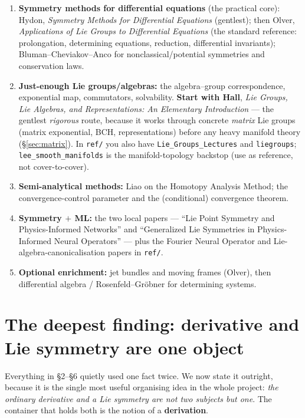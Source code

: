 \documentclass[11pt]{article}
\theoremstyle{definition}
\theoremstyle{remark}
\begin{document}
\begin{enumerate}[nosep]
  \item \textbf{Symmetry methods for differential equations} (the practical core): Hydon,
        \emph{Symmetry Methods for Differential Equations} (gentlest); then Olver,
        \emph{Applications of Lie Groups to Differential Equations} (the standard reference: prolongation,
        determining equations, reduction, differential invariants); Bluman--Cheviakov--Anco for
        nonclassical/potential symmetries and conservation laws.
  \item \textbf{Just-enough Lie groups/algebras:} the algebra--group correspondence, exponential map,
        commutators, solvability. \textbf{Start with Hall}, \emph{Lie Groups, Lie Algebras, and
        Representations: An Elementary Introduction} --- the gentlest \emph{rigorous} route, because it
        works through concrete \emph{matrix} Lie groups (matrix exponential, BCH, representations) before
        any heavy manifold theory (\S\ref{sec:matrix}). In \texttt{ref/} you also have
        \texttt{Lie\_Groups\_Lectures} and \texttt{liegroups}; \texttt{lee\_smooth\_manifolds} is the
        manifold-topology backstop (use as reference, not cover-to-cover).
  \item \textbf{Semi-analytical methods:} Liao on the Homotopy Analysis Method; the convergence-control
        parameter and the (conditional) convergence theorem.
  \item \textbf{Symmetry $+$ ML:} the two local papers --- ``Lie Point Symmetry and Physics-Informed
        Networks'' and ``Generalized Lie Symmetries in Physics-Informed Neural Operators'' --- plus the
        Fourier Neural Operator and Lie-algebra-canonicalisation papers in \texttt{ref/}.
  \item \textbf{Optional enrichment:} jet bundles and moving frames (Olver), then differential algebra /
        Rosenfeld--Gr\"obner for determining systems.
\end{enumerate}

\section{The deepest finding: derivative and Lie symmetry are one object}
\label{sec:atom}

Everything in \S2--\S6 quietly used one fact twice. We now state it outright, because it is the
single most useful organising idea in the whole project: \emph{the ordinary derivative and a Lie
symmetry are not two subjects but one}. The container that holds both is the notion of a
\textbf{derivation}.
\end{document}

